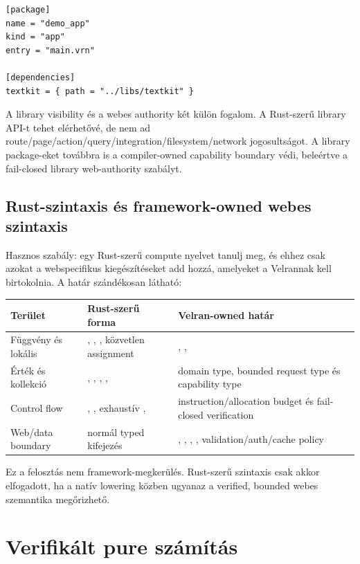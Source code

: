 \begin{lstlisting}
[package]
name = "demo_app"
kind = "app"
entry = "main.vrn"

[dependencies]
textkit = { path = "../libs/textkit" }
\end{lstlisting}

A library visibility és a webes authority két külön fogalom. A  Rust-szerű library API-t tehet elérhetővé, de nem ad route/page/action/query/integration/filesystem/network jogosultságot. A library package-eket továbbra is a compiler-owned capability boundary védi, beleértve a fail-closed library web-authority szabályt.

\subsection*{Rust-szintaxis és framework-owned webes szintaxis}

Hasznos szabály: egy Rust-szerű compute nyelvet tanulj meg, és ehhez csak azokat a webspecifikus kiegészítéseket add hozzá, amelyeket a Velrannak kell birtokolnia. A határ szándékosan látható:

\begin{center}
\begin{tabularx}{\textwidth}{@{}L{0.30\textwidth}YY@{}}
\toprule
Terület & Rust-szerű forma & Velran-owned határ \\
\midrule
Függvény és lokális & , , , közvetlen assignment & , ,  \\
Érték és kollekció & , , , ,  & domain type, bounded request type és capability type \\
Control flow & , , exhaustív ,  & instruction/allocation budget és fail-closed verification \\
Web/data boundary & normál typed kifejezés & , , , , validation/auth/cache policy \\
\bottomrule
\end{tabularx}
\end{center}

Ez a felosztás nem framework-megkerülés. Rust-szerű szintaxis csak akkor elfogadott, ha a natív lowering közben ugyanaz a verified, bounded webes szemantika megőrizhető.


\section{Verifikált pure számítás}

